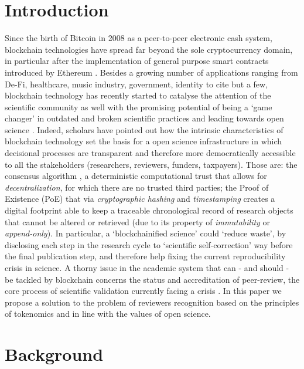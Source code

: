 \documentclass[runningheads]{llncs}
\begin{document}
\section{Introduction}
Since the birth of Bitcoin\cite{BitcoinSatoshi} in 2008 as a peer-to-peer electronic cash system, blockchain technologies have spread far beyond the sole cryptocurrency domain, in particular after the implementation of general purpose smart contracts introduced by Ethereum \cite{Ethereum-Wood}.
Besides a growing number of applications ranging from De-Fi, healthcare, music industry, government, identity to cite but a few, blockchain technology has recently started to catalyse the attention of the scientific community as well \cite{Bitcoin-Nature-focus,vanRossum2017-DigSci} with the promising potential of being a `game changer' in outdated and broken scientific practices and leading towards open science \cite{AES}. Indeed, scholars have pointed out how the intrinsic characteristics of blockchain technology set the basis for a open science infrastructure \cite{ReviewBlockchain2019} in which decisional processes are transparent and therefore more democratically accessible to all the stakeholders (researchers, reviewers, funders, taxpayers). Those are: the consensus algorithm \cite{ConsAlg}, a deterministic computational trust that allows for \emph{decentralization}, for which there are no trusted third parties; the Proof of Existence (PoE) that via \emph{cryptographic hashing} and \emph{timestamping} creates a digital footprint able to keep a traceable chronological record of research objects that cannot be altered or retrieved (due to its property of \emph{immutability} or \emph{append-only})\cite{ReviewBlockchain2019}. In particular, a `blockchainified science'\cite{BlockchainforScience} could `reduce waste'\cite{ReducingWaste-Lancet}, by disclosing each step in the research cycle to `scientific self-correction' way before the final publication step, and therefore help fixing the current reproducibility crisis in science.
\newline A thorny issue in the academic system that can - and should - be tackled by blockchain concerns the status and accreditation of peer-review, the core process of scientific validation currently facing a crisis \cite{Gropp-PeerRevStress}.
In this paper we propose a solution to the problem of reviewers recognition based on the principles of tokenomics \cite{TokenEcon} and in line with the values of open science.

\section{Background}
\end{document}
